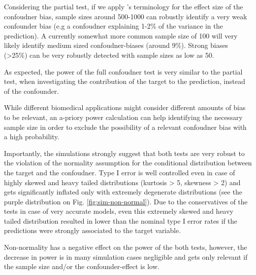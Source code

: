 \documentclass{article}
\begin{document}
Considering the partial test, if we apply \citeauthor{cohen2013statistical}'s terminology for the effect size of the confoudner bias, sample sizes around 500-1000 can robustly identify a very weak confounder bias (e.g a confoudner explaining 1-2\% of the variance in the prediction). A currently somewhat more common sample size of 100 will very likely identify medium sized confoudner-biases (around 9\%). Strong biases  (>25\%) can be very robustly detected with sample sizes as low as 50. 

As expected, the power of the full confoudner test is very similar to the partial test, when investigating the contribution of the target to the prediction, instead of the confounder.

While different biomedical applications might consider different amounts of bias to be relevant, an a-priory power calculation can help identifying the necessary sample size in order to exclude the possibility of a relevant confoudner bias with a high probability.

Importantly, the simulations strongly suggest that both tests are very robust to the violation of the normality assumption for the conditional distribution between the target and the confoudner. Type I error is well controlled even in case of highly skewed and heavy tailed distributions (kurtosis > 5, skewness > 2) and gets significantly inflated only with extremely degenerate distributions (see the purple distribution on Fig. \ref{fig:sim-non-normal}). Due to the conservatives of the tests in case of very accurate models, even this extremely skewed and heavy tailed distribution resulted in lower than the nominal type I error rates if the predictions were strongly associated to the target variable.

Non-normality has a negative effect on the power of the both tests, however, the decrease in power is in many simulation cases negligible and gets only relevant if the sample size and/or the confounder-effect is low.
\end{document}
